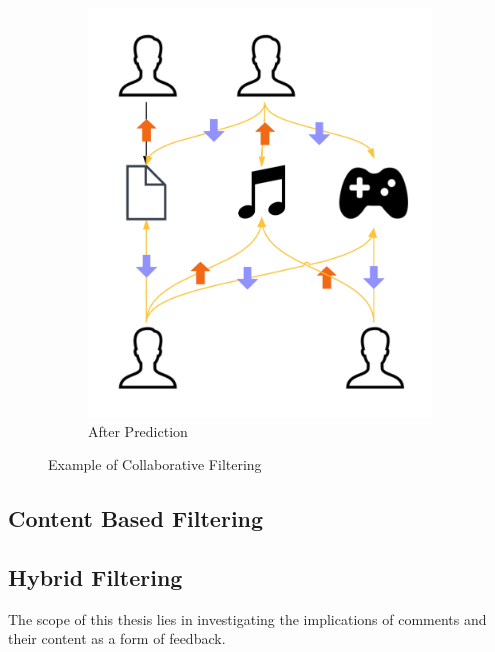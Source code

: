 \begin{figure}[!h]
\begin{subfigure}[b]{0.4\textwidth}
    \includegraphics[width=\textwidth]{c-back_images/cf_2.png}
    \caption{After Prediction}
    \label{fig:cf2}
\end{subfigure}
\caption{Example of Collaborative Filtering}
\label{fig:cf}
\end{figure}

\subsection{Content Based Filtering}

\subsection{Hybrid Filtering}

The scope of this thesis lies in investigating the implications of comments and their content as a form of feedback.